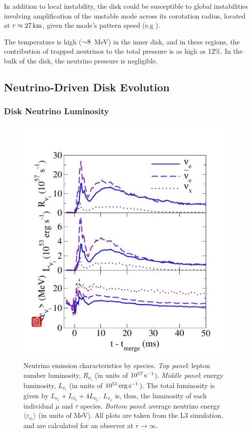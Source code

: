 In addition to local instability, the disk could be susceptible to global
instabilities involving amplification of the unstable mode across its corotation
radius, located at $r \approx 27\rm\,km$, given the mode's pattern
speed (e.g \citealt{papa1985-rot_stability}).

The temperature is high ($\mathord{\sim} 8$~MeV) in the inner disk, and in these
regions, the contribution of trapped neutrinos to the total pressure is as
high as 12\%.  In the bulk of the disk, the neutrino pressure is
negligible.

\subsection{Neutrino-Driven Disk Evolution}
\label{sec:neutrinodisk}

\subsubsection{Disk Neutrino Luminosity}

\begin{figure}
\centering
\includegraphics[width=11cm]{Figures/neutrinos_by_species}
\caption[Neutrino emission characteristics by species]{
Neutrino emission characteristics by species.
{\em Top panel}: lepton number luminosity, $R_{\nu_i}$
(in units of $10^{57}\rm\,s^{-1}$).
{\em Middle panel}: energy luminosity, $L_{\nu_i}$
(in units of $10^{53}\rm\,erg\,s^{-1}$).
The total luminosity is given by $L_{\nu_e}+L_{\bar{\nu_e}}+4L_{\nu_x}$. 
$L_{\nu_x}$ is, thus, the luminosity of each individual $\mu$ and $\tau$
species.
{\em Bottom panel}: average neutrino energy $\langle \varepsilon_{\nu_i} \rangle$
(in units of MeV).
All plots are taken from the L3 simulation, and are calculated for
an observer at $r \rightarrow \infty$.
}
\label{fig:neutrinos_by_species}
\end{figure}

